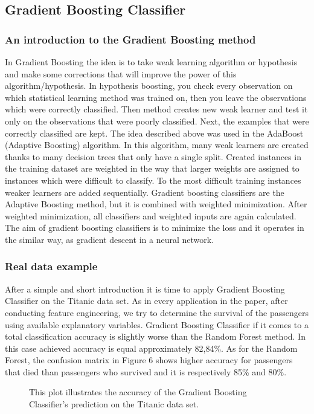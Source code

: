 \subsection{Gradient Boosting Classifier}
\label{sec:gradient_boosting}

\subsubsection{An introduction to the Gradient Boosting method}
In Gradient Boosting the idea is to take weak learning algorithm or hypothesis and make some corrections that will improve the power of this algorithm/hypothesis. In hypothesis boosting, you check every observation on which statistical learning method was trained on, then you leave the observations which were correctly classified. Then method creates new weak learner and test it only on the observations that were poorly classified. Next, the examples that were correctly classified are kept.
The idea described above was used in the AdaBoost (Adaptive Boosting) algorithm. In this algorithm, many weak learners are created thanks to many decision trees that only have a single split. Created instances in the training dataset are weighted in the way that larger weights are assigned to instances which were difficult to classify. To the most difficult training instances weaker learners are added sequentially.
Gradient boosting classifiers are the Adaptive Boosting method, but it is combined with weighted minimization. After weighted minimization, all classifiers and weighted inputs are again calculated. The aim of gradient boosting classifiers is to minimize the loss and it operates in the similar way, as gradient descent in a neural network.
\subsubsection{Real data example}

After a simple and short introduction it is time to apply Gradient Boosting Classifier on the Titanic data set. As in every application in the paper,
after conducting feature engineering, we try to determine the survival of the passengers using available explanatory variables. 
Gradient Boosting Classifier if it comes to a total classification accuracy is slightly worse than the Random Forest method. In this case achieved accuracy is equal
approximately 82,84\%. 
As for the Random Forest, the confusion matrix in Figure 6
shows higher accuracy for passengers that died than passengers who survived and it is respectively 85\% and 80\%.


\begin{figure}[H]
    \captionsetup{format=plain}
    \caption{This plot illustrates the accuracy of the Gradient Boosting Classifier's prediction on
             the Titanic data set.}
    \label{fig:confusion_matrix_gradient_boosting}
\end{figure}


